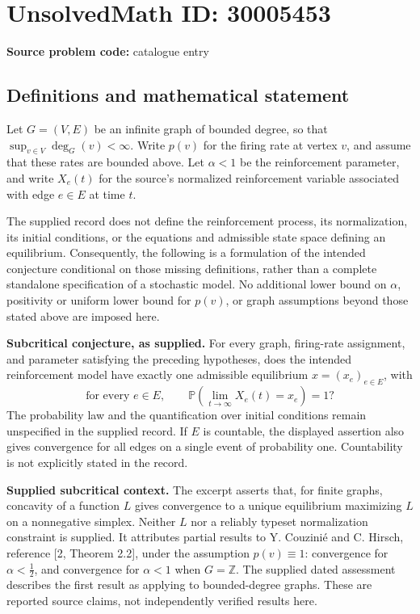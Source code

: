 \documentclass[11pt]{article}
\begin{document}
\section*{UnsolvedMath ID: 30005453}
\textbf{Source problem code:} catalogue entry
\subsection{Definitions and mathematical statement}
Let \(G=(V,E)\) be an infinite graph of bounded degree, so that \(\sup_{v\in V}\deg_G(v)<\infty\). Write \(p(v)\) for the firing rate at vertex \(v\), and assume that these rates are bounded above. Let \(\alpha<1\) be the reinforcement parameter, and write \(X_e(t)\) for the source's normalized reinforcement variable associated with edge \(e\in E\) at time \(t\).

The supplied record does not define the reinforcement process, its normalization, its initial conditions, or the equations and admissible state space defining an equilibrium. Consequently, the following is a formulation of the intended conjecture conditional on those missing definitions, rather than a complete standalone specification of a stochastic model. No additional lower bound on \(\alpha\), positivity or uniform lower bound for \(p(v)\), or graph assumptions beyond those stated above are imposed here.

\textbf{Subcritical conjecture, as supplied.} For every graph, firing-rate assignment, and parameter satisfying the preceding hypotheses, does the intended reinforcement model have exactly one admissible equilibrium \(x=(x_e)_{e\in E}\), with
\[
\text{for every }e\in E,\qquad
\mathbb P\!\left(\lim_{t\to\infty}X_e(t)=x_e\right)=1?
\]
The probability law and the quantification over initial conditions remain unspecified in the supplied record. If \(E\) is countable, the displayed assertion also gives convergence for all edges on a single event of probability one. Countability is not explicitly stated in the record.

\textbf{Supplied subcritical context.} The excerpt asserts that, for finite graphs, concavity of a function \(L\) gives convergence to a unique equilibrium maximizing \(L\) on a nonnegative simplex. Neither \(L\) nor a reliably typeset normalization constraint is supplied. It attributes partial results to Y. Couzini\'e and C. Hirsch, reference [2, Theorem 2.2], under the assumption \(p(v)\equiv1\): convergence for \(\alpha<\tfrac12\), and convergence for \(\alpha<1\) when \(G=\mathbb Z\). The supplied dated assessment describes the first result as applying to bounded-degree graphs. These are reported source claims, not independently verified results here.
\end{document}
